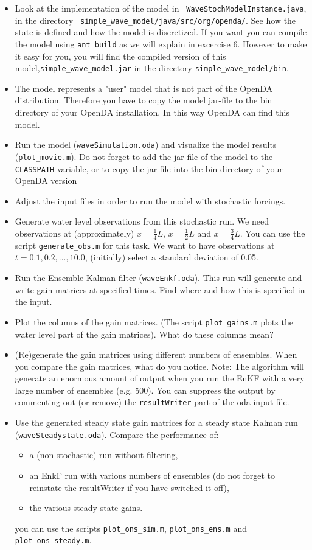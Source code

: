 \documentclass[a4paper,10pt]{article}
\begin{document}
\begin{itemize}
\item Look at the implementation of the model in {\tt
  WaveStochModelInstance.java}, in the directory {\tt
  simple\_wave\_model/java/src/org/openda/}. See how the state is defined and how
  the model is discretized. If you want you can compile the model using {\tt ant
  build} as we will explain in excercise 6. However to make it easy for you, you
  will find the compiled version of this model,{\tt simple\_wave\_model.jar} in
  the directory {\tt simple\_wave\_model/bin}.
\item The model represents a "user" model that is not part of the OpenDA distribution. Therefore you have to copy the
 model jar-file to the bin directory of your OpenDA installation. In this way OpenDA can find this model.
\item Run the model ({\tt waveSimulation.oda}) and visualize the model results
  ({\tt plot\_movie.m}). Do not forget to add the jar-file of the model to the
  {\tt CLASSPATH} variable, or to copy the jar-file into the bin directory of
  your OpenDA version
\item Adjust the input files in order to run the model with stochastic
  forcings.
\item Generate water level observations from this stochastic run. We need
  observations at (approximately) $x=\frac{1}{4} L$, $x=\frac{1}{2} L$ and
  $x=\frac{3}{4} L$. You can use the script {\tt generate\_obs.m} for this
  task. We want to have observations at $t=0.1, 0.2,...,10.0$, (initially)
  select a standard deviation of 0.05.
\item Run the Ensemble Kalman filter ({\tt waveEnkf.oda}). This run will
  generate and write gain matrices at specified times. Find where and how this
  is specified in the input.
\item Plot the columns of the gain matrices. (The script {\tt plot\_gains.m}
  plots the water level part of the gain matrices). What do these columns mean?
\item (Re)generate the gain matrices using different numbers of ensembles. When
  you compare the gain matrices, what do you notice. Note: The algorithm will
  generate an enormous amount of output when you run the EnKF with a very large
  number of ensembles (e.g. 500). You can suppress the output by commenting out
  (or remove) the {\tt resultWriter}-part of the oda-input file.
\item Use the generated steady state gain matrices for a steady state Kalman
  run ({\tt waveSteadystate.oda}). Compare the performance of:
  \begin{itemize}
  \item a (non-stochastic) run without filtering,
  \item an EnkF run with various numbers of ensembles (do not forget to
    reinstate the resultWriter if you have switched it off),
  \item the various steady state gains.
  \end{itemize}
 you can use the scripts {\tt plot\_ons\_sim.m}, {\tt plot\_ons\_ens.m}
 and\\ {\tt plot\_ons\_steady.m}.


\end{itemize}
\end{document}
